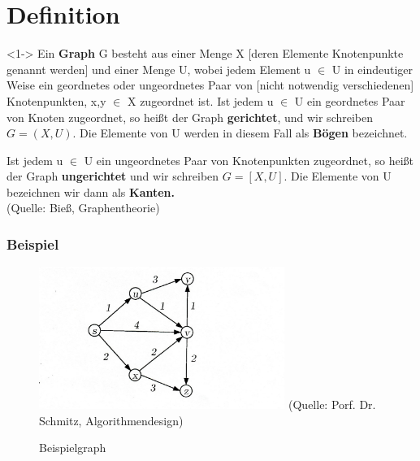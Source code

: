 \section{Definition}

\begin{frame}
	\begin{block}<1->{}
				Ein \textbf{Graph} G besteht aus einer Menge X [deren Elemente Knotenpunkte genannt werden] und einer Menge U, wobei jedem Element u $\in$ U in eindeutiger Weise ein geordnetes oder ungeordnetes Paar von [nicht notwendig verschiedenen] Knotenpunkten, x,y $\in$ X zugeordnet ist.
				Ist jedem u $\in$ U ein geordnetes Paar von Knoten zugeordnet, so heißt der Graph \textbf{gerichtet}, und wir schreiben 
				$G= (X, U)$.
				Die Elemente von U werden in diesem Fall als \textbf{Bögen} bezeichnet.

				Ist jedem u $\in$ U ein ungeordnetes Paar von Knotenpunkten zugeordnet, so heißt der Graph \textbf{ungerichtet} und wir schreiben 
				$G=[X,U]$. 
				Die Elemente von U bezeichnen wir dann als \textbf{Kanten.} \\
				\tiny (Quelle: Bieß, Graphentheorie)
	\end{block}
\end{frame}

\begin{frame}
\frametitle{Beispiel}
	\begin{figure}[h]
\centering
\includegraphics[width = 8cm]{./pictures/00_Graph.jpg}
\tiny (Quelle: Porf. Dr. Schmitz, Algorithmendesign)
\\
\caption{Beispielgraph}



\label{a1}
\end{figure}
\end{frame}
	